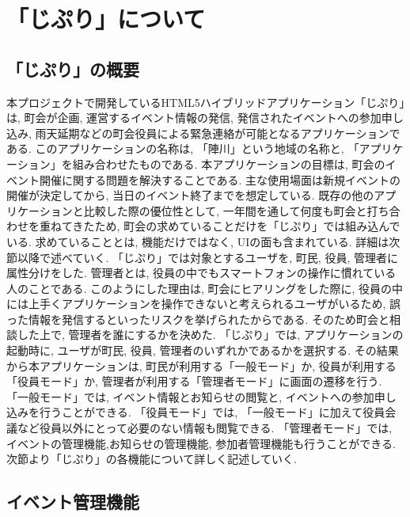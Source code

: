 \chapter{「じぷり」について}

\section{「じぷり」の概要\label{sec:app_overview}}
本プロジェクトで開発しているHTML5ハイブリッドアプリケーション「じぷり」は, 町会が企画, 運営するイベント情報の発信, 発信されたイベントへの参加申し込み, 雨天延期などの町会役員による緊急連絡が可能となるアプリケーションである. このアプリケーションの名称は, 「陣川」という地域の名称と, 「アプリケーション」を組み合わせたものである. 本アプリケーションの目標は, 町会のイベント開催に関する問題を解決することである. 主な使用場面は新規イベントの開催が決定してから, 当日のイベント終了までを想定している. 既存の他のアプリケーションと比較した際の優位性として, 一年間を通して何度も町会と打ち合わせを重ねてきたため, 町会の求めていることだけを「じぷり」では組み込んでいる. 求めていることとは, 機能だけではなく, UIの面も含まれている. 詳細は次節以降で述べていく. 「じぷり」では対象とするユーザを, 町民, 役員, 管理者に属性分けをした. 管理者とは, 役員の中でもスマートフォンの操作に慣れている人のことである. このようにした理由は, 町会にヒアリングをした際に, 役員の中には上手くアプリケーションを操作できないと考えられるユーザがいるため, 誤った情報を発信するといったリスクを挙げられたからである. そのため町会と相談した上で, 管理者を誰にするかを決めた. 「じぷり」では, アプリケーションの起動時に, ユーザが町民, 役員, 管理者のいずれかであるかを選択する. その結果から本アプリケーションは, 町民が利用する「一般モード」か, 役員が利用する「役員モード」か, 管理者が利用する「管理者モード」に画面の遷移を行う. 「一般モード」では, イベント情報とお知らせの閲覧と, イベントへの参加申し込みを行うことができる. 「役員モード」では, 「一般モード」に加えて役員会議など役員以外にとって必要のない情報も閲覧できる. 「管理者モード」では, イベントの管理機能,お知らせの管理機能, 参加者管理機能も行うことができる. 次節より「じぷり」の各機能について詳しく記述していく.

\section{イベント管理機能}%
